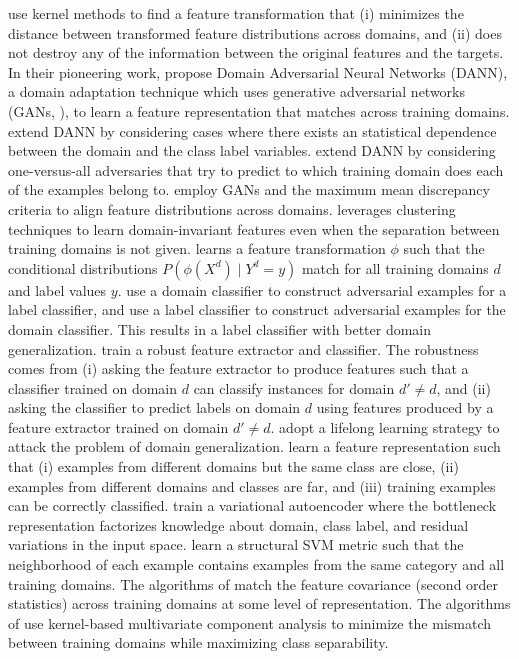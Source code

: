 \documentclass{article}
\begin{document}
\citet{muandet2013domain} use kernel methods to find a feature transformation that (i) minimizes the distance between transformed feature distributions across domains, and (ii) does not destroy any of the information between the original features and the targets.
%
In their pioneering work, \citet{ganin2016domain} propose Domain Adversarial Neural Networks (DANN), a domain adaptation technique which uses generative adversarial networks (GANs, \citet{goodfellow2014generative}), to learn a feature representation that matches across training domains.
%
\citet{akuzawa2019adversarial} extend DANN by considering cases where there exists an statistical dependence between the domain and the class label variables.
%
\citet{albuquerque2019a} extend DANN by considering one-versus-all adversaries that try to predict to which training domain does each of the examples belong to.
%
\citet{li2018domain} employ GANs and the maximum mean discrepancy criteria \citep{gretton2012kernel} to align feature distributions across domains.
%
\citet{matsuura2019domain} leverages clustering techniques to learn domain-invariant features even when the separation between training domains is not given.
%
\citet{li2018domain2, li2018deep} learns a feature transformation $\phi$ such that the conditional distributions $P(\phi(X^d) \mid Y^d=y)$ match for all training domains $d$ and label values $y$.
%
\citet{shankar2018generalizing} use a domain classifier to construct adversarial examples for a label classifier, and use a label classifier to construct adversarial examples for the domain classifier. This results in a label classifier with better domain generalization. 
%
\citet{li2019episodic} train a robust feature extractor and classifier. The robustness comes from (i) asking the feature extractor to produce features such that a classifier trained on domain $d$ can classify instances for domain $d' \neq d$, and (ii) asking the classifier to predict labels on domain $d$ using features produced by a feature extractor trained on domain $d' \neq d$. 
%
\citet{li2020sequential} adopt a lifelong learning strategy to attack the problem of domain generalization.
%
\citet{motiian2017unified} learn a feature representation such that (i) examples from different domains but the same class are close, (ii) examples from different domains and classes are far, and (iii) training examples can be correctly classified.
%
\citet{ilse2019diva} train a variational autoencoder \citep{kingma2013auto} where the bottleneck representation factorizes knowledge about domain, class label, and residual variations in the input space.
%
\citet{fang2013unbiased} learn a structural SVM metric such that the neighborhood of each example contains examples from the same category and all training domains.
The algorithms of \citet{sun2016deep, sun2016return, rahman2019correlation} match the feature covariance (second order statistics) across training domains at some level of representation.
%
The algorithms of \citet{ghifary2016scatter, hu2019domain} use kernel-based multivariate component analysis to minimize the mismatch between training domains while maximizing class separability.
\end{document}
